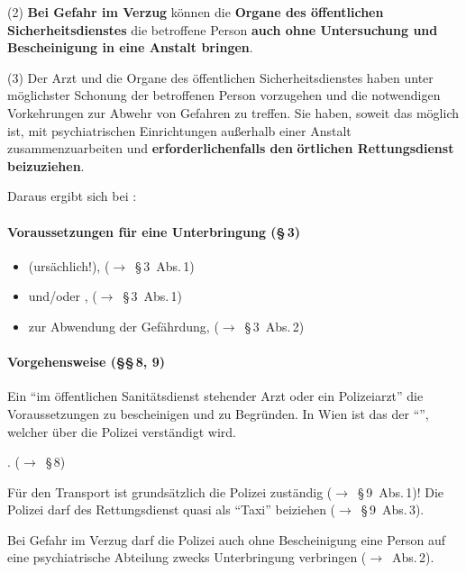(2) \textbf{Bei Gefahr im Verzug} können die \textbf{Organe des
öffentlichen Sicherheitsdienstes} die betroffene Person \textbf{auch
ohne Untersuchung und Bescheinigung in eine Anstalt bringen}.

(3) Der Arzt und die Organe des öffentlichen Sicherheitsdienstes haben
unter möglichster Schonung der betroffenen Person vorzugehen und die
notwendigen Vorkehrungen zur Abwehr von Gefahren zu treffen. Sie haben,
soweit das möglich ist, mit psychiatrischen Einrichtungen
außerhalb einer Anstalt zusammenzuarbeiten und
\textbf{erforderlichenfalls den }\textbf{örtlichen Rettungsdienst
beizuziehen}.

Daraus ergibt sich bei :

\paragraph{Voraussetzungen für eine Unterbringung ({\S}\,3)}

\begin{itemize}
    \item {}
    (ursächlich!), (${\rightarrow}$~{\S}\,3~Abs.\,1)
    \item {}  und/oder
    ,
    (${\rightarrow}$~{\S}\,3~Abs.\,1)
    \item {} zur Abwendung der Gefährdung,
    (${\rightarrow}$~{\S}\,3~Abs.\,2)
\end{itemize}

\paragraph{Vorgehensweise ({\S}{\S}\,8, 9)}

Ein "`im öffentlichen Sanitätsdienst stehender Arzt
oder ein Polizeiarzt"' die Voraussetzungen zu
bescheinigen und zu Begründen. In Wien ist das der
"`"',
welcher über die Polizei verständigt wird. 

.
(${\rightarrow}$~{\S}\,8)

Für den Transport ist grundsätzlich die Polizei zuständig
(${\rightarrow}$~{\S}\,9~Abs.\,1)! Die Polizei darf des Rettungsdienst
quasi als "`Taxi"' beiziehen
(${\rightarrow}$~{\S}\,9~Abs.\,3). 

Bei Gefahr im Verzug darf die Polizei auch ohne Bescheinigung eine
Person auf eine psychiatrische Abteilung zwecks Unterbringung
verbringen (${\rightarrow}$~Abs.\,2). 


